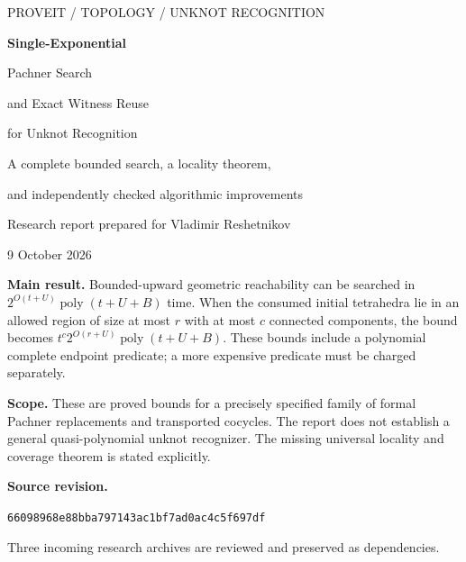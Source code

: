 \documentclass[11pt]{article}
\theoremstyle{definition}
\theoremstyle{remark}
\DeclareMathOperator{\poly}{poly}
\newcommand{\basecommit}{\texttt{66098968e88bba797143ac1bf7ad0ac4c5f697df}}
\begin{document}
\hypersetup{pageanchor=false}
\begin{titlepage}
\vspace*{1.2cm}
{\color{teal}\large PROVEIT / TOPOLOGY / UNKNOT RECOGNITION\par}
\vspace{0.6cm}
{\color{navy}\Huge\bfseries Single-Exponential\par Pachner Search\par}
\vspace{0.3cm}
{\color{navy}\LARGE and Exact Witness Reuse\par for Unknot Recognition\par}
\vspace{0.9cm}
{\large A complete bounded search, a locality theorem,\par
and independently checked algorithmic improvements\par}
\vspace{0.8cm}
Research report prepared for Vladimir Reshetnikov\par
9 October 2026\par
\vfill
\noindent\textbf{Main result.} Bounded-upward geometric reachability can be searched in
$2^{O(t+U)}\poly(t+U+B)$ time. When the consumed initial tetrahedra lie in an allowed
region of size at most $r$ with at most $c$ connected components, the bound becomes
$t^c2^{O(r+U)}\poly(t+U+B)$. These bounds include a polynomial complete
endpoint predicate; a more expensive predicate must be charged separately.

\medskip
\noindent\textbf{Scope.} These are proved bounds for a precisely specified family of
formal Pachner replacements and transported cocycles. The report does not establish
a general quasi-polynomial unknot recognizer. The missing universal locality and
coverage theorem is stated explicitly.

\medskip
\noindent\textbf{Source revision.}\par
\small\basecommit\par
\noindent Three incoming research archives are reviewed and preserved as dependencies.
\end{titlepage}
\hypersetup{pageanchor=true}
\end{document}
